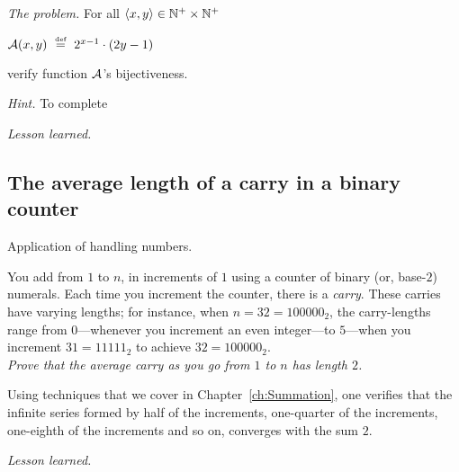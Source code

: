 \noindent \textit{The problem.}
For all $\langle x,y \rangle \in \mathbb{N}^+ \times \mathbb{N}^+$

$\mbox{$\cal A$}(x,y) \ \stackrel{\mbox{{\tiny def}}}{=} \ 2^{x-1} \cdot (2y -1)$

verify function $\mbox{$\cal A$}$'s bijectiveness.
\medskip

\noindent \textit{Hint.}
To complete
\medskip

\noindent \textit{Lesson learned.}



\subsection{The average length of a carry in a binary counter}

Application of handling numbers.
\medskip

%
You add from $1$ to $n$, in increments of $1$ using a counter of
binary (or, base-$2$) numerals.  Each time you increment the counter,
there is a {\it carry}.  These carries have varying lengths; for
instance, when $n = 32 = 100000_2$, the carry-lengths range
from $0$---whenever you increment an even integer---to $5$---when you
increment $31 = 11111_2$ to achieve $32 = 100000_2$. \\
{\em Prove that the average carry as you go from $1$ to $n$ has length $2$.}
\medskip

Using techniques that we cover in Chapter~\ref{ch:Summation}, one
verifies that the infinite series formed by half of the increments, one-quarter of the increments,
one-eighth of the increments and so on, converges with the sum $2$. 
\medskip

\noindent \textit{Lesson learned.}


